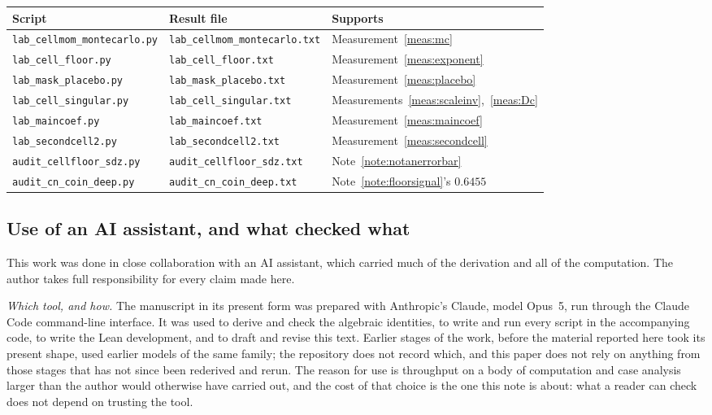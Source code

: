\documentclass[11pt,a4paper]{article}
\theoremstyle{plain}
\theoremstyle{definition}
\theoremstyle{remark}
\begin{document}
\begin{center}
\begin{tabular}{lll}
\hline
Script & Result file & Supports\\
\hline
\texttt{lab\_cellmom\_montecarlo.py} &
 \texttt{lab\_cellmom\_montecarlo.txt} & Measurement~\ref{meas:mc}\\
\texttt{lab\_cell\_floor.py} & \texttt{lab\_cell\_floor.txt}
 & Measurement~\ref{meas:exponent}\\
\texttt{lab\_mask\_placebo.py} & \texttt{lab\_mask\_placebo.txt}
 & Measurement~\ref{meas:placebo}\\
\texttt{lab\_cell\_singular.py} & \texttt{lab\_cell\_singular.txt}
 & Measurements~\ref{meas:scaleinv},~\ref{meas:Dc}\\
\texttt{lab\_maincoef.py} & \texttt{lab\_maincoef.txt}
 & Measurement~\ref{meas:maincoef}\\
\texttt{lab\_secondcell2.py} & \texttt{lab\_secondcell2.txt}
 & Measurement~\ref{meas:secondcell}\\
\texttt{audit\_cellfloor\_sdz.py} & \texttt{audit\_cellfloor\_sdz.txt}
 & Note~\ref{note:notanerrorbar}\\
\texttt{audit\_cn\_coin\_deep.py} & \texttt{audit\_cn\_coin\_deep.txt}
 & Note~\ref{note:floorsignal}'s $0.6455$\\
\hline
\end{tabular}
\end{center}

\subsection*{Use of an AI assistant, and what checked what}

This work was done in close collaboration with an AI assistant, which
carried much of the derivation and all of the computation. The author
takes full responsibility for every claim made here.

\emph{Which tool, and how.} The manuscript in its present form was
prepared with Anthropic's Claude, model Opus~5, run through the Claude
Code command-line interface. It was used to derive and check the
algebraic identities, to write and run every script in the accompanying
code, to write the Lean development, and to draft and revise this text.
Earlier stages of the work, before the material reported here took its
present shape, used earlier models of the same family; the repository
does not record which, and this paper does not rely on anything from
those stages that has not since been rederived and rerun. The reason
for use is throughput on a body of computation and case analysis larger
than the author would otherwise have carried out, and the cost of that
choice is the one this note is about: what a reader can check does not
depend on trusting the tool.
\end{document}
